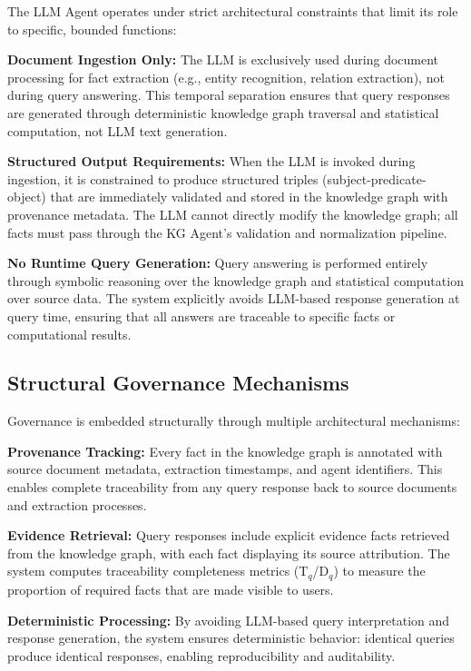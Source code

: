 The LLM Agent operates under strict architectural constraints that limit its role to specific, bounded functions:

\textbf{Document Ingestion Only:} The LLM is exclusively used during document processing for fact extraction (e.g., entity recognition, relation extraction), not during query answering. This temporal separation ensures that query responses are generated through deterministic knowledge graph traversal and statistical computation, not LLM text generation.

\textbf{Structured Output Requirements:} When the LLM is invoked during ingestion, it is constrained to produce structured triples (subject-predicate-object) that are immediately validated and stored in the knowledge graph with provenance metadata. The LLM cannot directly modify the knowledge graph; all facts must pass through the KG Agent's validation and normalization pipeline.

\textbf{No Runtime Query Generation:} Query answering is performed entirely through symbolic reasoning over the knowledge graph and statistical computation over source data. The system explicitly avoids LLM-based response generation at query time, ensuring that all answers are traceable to specific facts or computational results.

\subsection{Structural Governance Mechanisms}

Governance is embedded structurally through multiple architectural mechanisms:

\textbf{Provenance Tracking:} Every fact in the knowledge graph is annotated with source document metadata, extraction timestamps, and agent identifiers. This enables complete traceability from any query response back to source documents and extraction processes.

\textbf{Evidence Retrieval:} Query responses include explicit evidence facts retrieved from the knowledge graph, with each fact displaying its source attribution. The system computes traceability completeness metrics (T$_q$/D$_q$) to measure the proportion of required facts that are made visible to users.

\textbf{Deterministic Processing:} By avoiding LLM-based query interpretation and response generation, the system ensures deterministic behavior: identical queries produce identical responses, enabling reproducibility and auditability.

